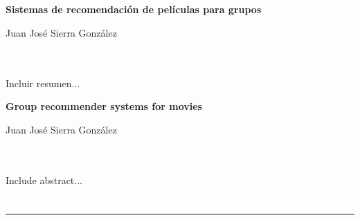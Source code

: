 \chapter*{}






\cleardoublepage
\thispagestyle{empty}

\begin{center}
{\large\bfseries Sistemas de recomendación de películas para grupos}\\
\end{center}
\begin{center}
Juan José Sierra González\\
\end{center}

\\

\vspace{0.7cm}
\\

Incluir resumen...
\cleardoublepage


\thispagestyle{empty}


\begin{center}
{\large\bfseries Group recommender systems for movies}\\
\end{center}
\begin{center}
Juan José Sierra González\\
\end{center}

\\

\vspace{0.7cm}
\\

Include abstract...

\chapter*{}
\thispagestyle{empty}

\noindent\rule[-1ex]{\textwidth}{2pt}\\[4.5ex]

